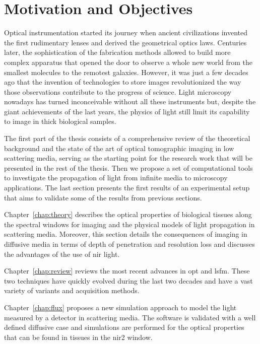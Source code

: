 \chapter*{Motivation and Objectives}

Optical instrumentation started its journey when ancient civilizations invented the first rudimentary lenses and derived the geometrical optics laws. Centuries later, the sophistication of the fabrication methods allowed to build more complex apparatus that opened the door to observe a whole new world from the smallest molecules to the remotest galaxies. However, it was just a few decades ago that the invention of technologies to store images revolutionized the way those observations contribute to the progress of science. Light microscopy nowadays has turned inconceivable without all these instruments but, despite the giant achievements of the last years, the physics of light still limit its capability to image in thick biological samples.


The first part of the thesis consists of a comprehensive review of the theoretical background and the state of the art of optical tomographic imaging in low scattering media, serving as the starting point for the research work that will be presented in the rest of the thesis. Then we propose a set of computational tools to investigate the propagation of light from infinite media to microscopy applications. The last section presents the first results of an experimental setup that aims to validate some of the results from previous sections.

Chapter~\ref{chap:theory} describes the optical properties of biological tissues along the spectral windows for imaging and the physical models of light propagation in scattering media. Moreover, this section details the consequences of imaging in diffusive media in terms of depth of penetration and resolution loss and discusses the advantages of the use of \gls{nir} light.

Chapter~\ref{chap:review} reviews the most recent advances in \gls{opt} and \gls{lsfm}. These two techniques have quickly evolved during the last two decades and have a vast variety of variants and acquisition methods. 

Chapter~\ref{chap:flux} proposes a new simulation approach to model the light measured by a detector in scattering media. The software is validated with a well defined diffusive case and simulations are performed for the optical properties that can be found in tissues in the \gls{nir2} window.

